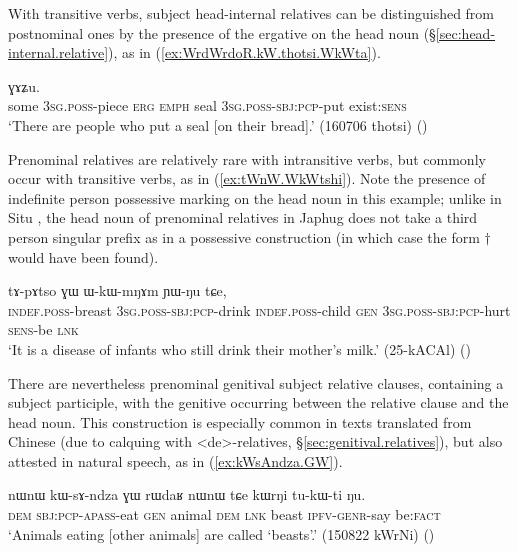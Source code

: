 With transitive verbs, subject head-internal relatives can be distinguished from postnominal ones by the presence of the ergative  on the head noun (§\ref{sec:head-internal.relative}), as in (\ref{ex:WrdWrdoR.kW.thotsi.WkWta}).

\begin{exe}
\ex \label{ex:WrdWrdoR.kW.thotsi.WkWta}
  ɣɤʑu. \\
 some \textsc{3sg}.\textsc{poss}-piece \textsc{erg} \textsc{emph} seal \textsc{3sg}.\textsc{poss}-\textsc{sbj}:\textsc{pcp}-put exist:\textsc{sens} \\
 \glt `There are people who put a seal [on their bread].' (160706 thotsi) ()
\end{exe}

Prenominal relatives are relatively rare with intransitive verbs, but commonly occur with transitive verbs, as in (\ref{ex:tWnW.WkWtshi}). Note the presence of indefinite person possessive marking on the head noun  in this example; unlike in Situ \citep{jacksonlin07}, the head noun of prenominal relatives in Japhug does not take a third person singular prefix as in a possessive construction (in which case the form $\dagger$ would have been found).

\begin{exe}
\ex \label{ex:tWnW.WkWtshi}
 \gll  [tɯ-nɯ ɯ-kɯ-tsʰi] tɤ-pɤtso ɣɯ ɯ-kɯ-mŋɤm ɲɯ-ŋu tɕe, \\
 \textsc{indef}.\textsc{poss}-breast \textsc{3sg}.\textsc{poss}-\textsc{sbj}:\textsc{pcp}-drink \textsc{indef}.\textsc{poss}-child \textsc{gen} \textsc{3sg}.\textsc{poss}-\textsc{sbj}:\textsc{pcp}-hurt \textsc{sens}-be \textsc{lnk} \\
 \glt `It is a disease of infants who still drink their mother's milk.' (25-kACAl)
()
\end{exe}

There are nevertheless prenominal genitival subject relative clauses, containing a subject participle, with the genitive  occurring between the relative clause and the head noun. This construction is especially common in texts translated from Chinese (due to calquing with  <de>-relatives, §\ref{sec:genitival.relatives}), but also attested in natural speech, as in (\ref{ex:kWsAndza.GW}).

\begin{exe}
\ex \label{ex:kWsAndza.GW}
 \gll nɯnɯ kɯ-sɤ-ndza ɣɯ rɯdaʁ nɯnɯ tɕe kɯrŋi tu-kɯ-ti ŋu.  \\
 \textsc{dem} \textsc{sbj}:\textsc{pcp}-\textsc{apass}-eat \textsc{gen} animal \textsc{dem} \textsc{lnk} beast \textsc{ipfv}-\textsc{genr}-say be:\textsc{fact} \\
 \glt `Animals eating [other animals] are called `beasts'.' (150822 kWrNi)
()
\end{exe}

